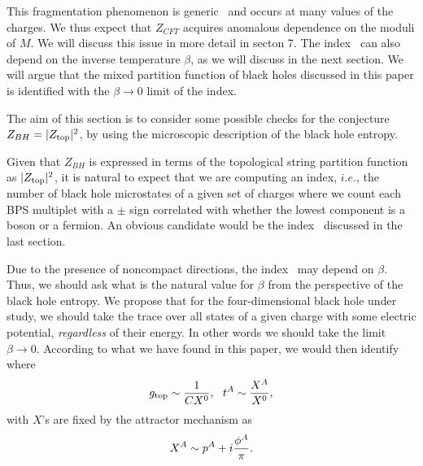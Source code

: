 This fragmentation phenomenon is generic \mms\ and occurs at many
values of the charges.
We thus expect that $Z_{CFT}$ acquires anomalous
dependence on the moduli of $M$. We will discuss this issue
in more detail in secton 7.
The index \dpar\ can also depend on the inverse temperature $\beta$,
as we will discuss in the next section. We will argue that the mixed
partition function of black holes discussed in this paper is
identified with the $\beta \rightarrow 0$ limit of the index.



The aim of this section is to consider some possible
checks for
the conjecture $Z_{BH}=|Z_{\rm top}|^2$, by using the microscopic
description of the black hole entropy.

 Given
that $Z_{BH}$ is expressed in terms of the topological string
partition function as $|Z_{\rm top}|^2$,
it is natural to expect that we are computing an index,
$i.e.$, the number of black hole microstates of a given
set of charges where we count each
BPS multiplet with a $\pm$ sign correlated with whether
the lowest component is a boson or a fermion. An obvious
candidate would be the index \dpar\ discussed in the last
section.

Due to the presence of noncompact directions,
the index \dpar\ may depend
on $\beta$. Thus, we should ask what is the natural value for $\beta$
from the perspective of the black hole entropy.  We propose
that for the four-dimensional black hole under study, we should
take the trace over all states of a given charge with some
electric potential, {\it regardless} of their energy.  In other
words we should take the limit $\beta \rightarrow 0$.
According to what we have found in this paper, we would then
identify
%
\eqn{}
%
where
%
$$ g_{\rm top} \sim {1\over C X^0}, ~~t^A \sim {X^A\over X^0}, $$
%
with $X$'s are fixed by the attractor mechanism as
%
$$ X^A \sim p^A + i {\phi^A \over \pi}. $$
%


